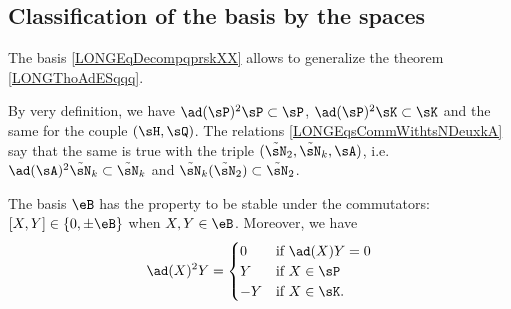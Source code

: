 %
\subsection{Classification of the basis by the spaces}
%

The basis \eqref{LONGEqDecompqprskXX} allows to generalize the theorem \ref{LONGThoAdESqqq}.

By very definition, we have $\ad(\sP)^2\sP\subset\sP$, $\ad(\sP)^2\sK\subset\sK$ and the same for the couple $(\sH,\sQ)$. The relations \eqref{LONGEqsCommWithtsNDeuxkA} say that the same is true with the triple $(\tilde\sN_2,\tilde\sN_k,\sA)$, i.e. $\ad(\sA)^2\tilde\sN_k\subset\tilde\sN_k$ and $\tilde\sN_k(\tilde\sN_2)\subset\tilde\sN_2$.

\begin{theorem}		\label{LONGThoAdSqIouZero}
	The basis $\eB$ has the property to be stable under the commutators: $[X,Y]\in\{0,\pm\eB\}$ when $X,Y\in\eB$. Moreover, we have
	\begin{equation}		\label{LONGEqadXsqYzYmY}
		\ad(X)^2Y=\begin{cases}
			0	&	\text{if }\ad(X)Y=0\\
			Y	&	\text{if }X\in\sP\\
			-Y	&	 \text{if }X\in\sK.
		\end{cases}
	\end{equation}
\end{theorem}

